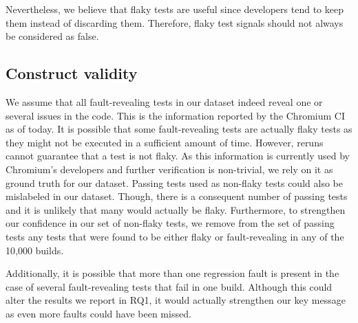 Nevertheless, we believe that flaky tests are useful since developers tend to keep them instead of discarding them. Therefore, flaky test signals should not always be considered as false. 

\subsection{Construct validity}
We assume that all fault-revealing tests in our dataset indeed reveal one or several issues in the code. This is the information reported by the Chromium CI as of today. It is possible that some fault-revealing tests are actually flaky tests as they might not be executed in a sufficient amount of time. However, reruns cannot guarantee that a test is not flaky. As this information is currently used by Chromium's developers and further verification is non-trivial, we rely on it as ground truth for our dataset. Passing tests used as non-flaky tests could also be mislabeled in our dataset. Though, there is a consequent number of passing tests and it is unlikely that many would actually be flaky. Furthermore, to strengthen our confidence in our set of non-flaky tests, we remove from the set of passing tests any tests that were found to be either flaky or fault-revealing in any of the 10,000 builds.

Additionally, it is possible that more than one regression fault is present in the case of several fault-revealing tests that fail in one build. Although this could alter the results we report in RQ1, it would actually strengthen our key message as even more faults could have been missed. %